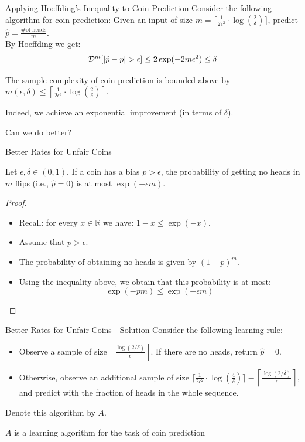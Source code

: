 \documentclass[11pt, usenames, dvipsnames]{beamer}
\begin{document}
\begin{frame}{Applying Hoeffding's Inequality to Coin Prediction}
Consider the following algorithm for coin prediction: 
Given an input of size $m=\lceil \frac{1}{2\epsilon^2} \cdot   \log(\frac{2}{\delta}) \rceil$, predict $\hat{p} = \frac{\# \text{of heads}}{m}$.\\
By Hoeffding we get:
$$\cD^m [|\hat{p}-p|>\epsilon ]\le 2 \exp(-2 m \epsilon ^2)\le\delta$$
\pause
\begin{corollary} 
The sample complexity of coin prediction is bounded above by
$m(\epsilon,\delta) \le \left \lceil \frac{1}{2\epsilon^2} \cdot
  \log(\frac{2}{\delta}) \right \rceil$.
\end{corollary}
Indeed, we achieve an exponential improvement (in terms of $\delta$).
\pause
\begin{exercise}
    Can we do better?
\end{exercise}
\end{frame}
\begin{frame}{Better Rates for Unfair Coins}
\begin{lemma}
Let $\epsilon, \delta \in (0,1)$. If a coin has a bias $p>\epsilon$,
the probability of getting no heads in $m$ flips (i.e., $\hat{p}=0$)
is at most $\exp(-\epsilon m)$. 
\end{lemma}
\pause
\begin{proof} 
\begin{itemize}
    \item Recall: for every $x \in \mathbb{R}$ we have: $1-x \le \exp(-x)$.
    \pause
    \item Assume that $p>\epsilon$.
    \pause
    \item The probability of obtaining no heads is given by $(1-p)^m$.
    \pause
    \item Using the inequality above, we obtain that this probability is at most: $$\exp(-pm) \le \exp(-\epsilon m)$$
\end{itemize}
  
\end{proof}
\end{frame}

\begin{frame}{Better Rates for Unfair Coins - Solution}
    Consider the following learning rule: 
    \begin{itemize}
        \item Observe a sample of size $\left \lceil \frac{\log(2/\delta)}{\epsilon} \right \rceil$. If there are no heads, return $\hat{p}=0$.
        \pause
        \item Otherwise, observe an additional sample of size $\lceil \frac{1}{2\epsilon^2} \cdot\log(\frac{4}{\delta}) \rceil - \left \lceil \frac{\log(2/\delta)}{\epsilon}\right \rceil$, and predict with the fraction of heads in the whole sequence.
    \end{itemize}
    \pause
      Denote this algorithm by $A$. 
      \pause
     \begin{claim}
        $A$ is a learning algorithm for the task of coin prediction
     \end{claim}
\end{frame}
\end{document}
